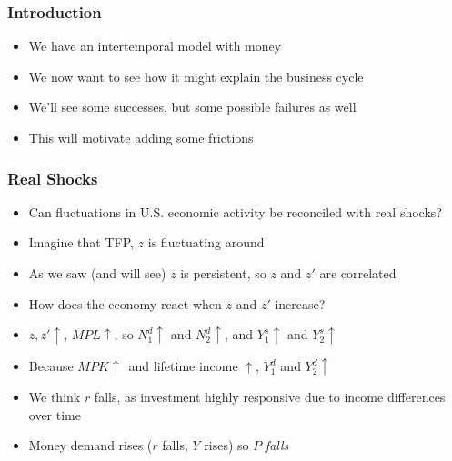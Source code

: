 \documentclass{beamer}
\author{Trevor S. Gallen}
\date{}
\begin{document}
\renewcommand*{\inserttotalframenumber}{\pageref{lastframe}}



\begin{frame}
\titlepage
\end{frame}

\begin{frame}
\frametitle[alignment=center]{Introduction}
\begin{itemize}
\item We have an intertemporal model with money
\bigskip
\item We now want to see how it might explain the business cycle
\bigskip
\item We'll see some successes, but some possible failures as well
\bigskip
\item This will motivate adding some frictions
\end{itemize}
\end{frame}

\begin{frame}
\frametitle[alignment=center]{Real Shocks}
\begin{itemize}
\item Can fluctuations in U.S. economic activity be reconciled with real shocks?
\smallskip
\item Imagine that TFP, $z$ is fluctuating around
\bigskip
\item As we saw (and will see) $z$ is persistent, so $z$ and $z'$ are correlated
\bigskip
\item How does the economy react when $z$ and $z'$ increase?  
\bigskip
\item $z,z'\uparrow$, $MPL\uparrow$, so $N^d_1\uparrow$ and $N^d_2\uparrow$, and $Y_1^s\uparrow$ and $Y_2^s\uparrow$
\item Because $MPK\uparrow$\ and lifetime income $\uparrow$, $Y^d_1$ and $Y^d_2\uparrow$
\item We think $r$ falls, as investment highly responsive due to income differences over time
\item Money demand rises ($r$ falls, $Y$ rises) so $P$ \emph{falls}
\end{itemize}
\end{frame}
\end{document}
